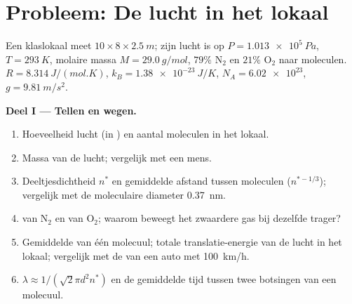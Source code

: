 \section{Probleem: De lucht in het lokaal}

\begin{problem}
\label{pb:b1:kinetic-theory:1}
Een klaslokaal meet $10 \times 8 \times \qty{2.5}{m}$; zijn lucht is op
$P = \qty{1.013e5}{Pa}$, $T = \qty{293}{K}$, molaire massa $M = \qty{29.0}{g/mol}$,
$79\%$ N$_2$ en $21\%$ O$_2$ naar moleculen. $R = \qty{8.314}{J/(mol.K)}$,
$k_B = \qty{1.38e-23}{J/K}$, $N_A = \num{6.02e23}$, $g = \qty{9.81}{m/s^2}$.

\medskip
\noindent\textbf{Deel I --- Tellen en wegen.}
\begin{enumerate}
  \item Hoeveelheid lucht (in ) en aantal moleculen in het lokaal.
  \item Massa van de lucht; vergelijk met een mens.
  \item Deeltjesdichtheid $n^*$ en gemiddelde afstand tussen moleculen
        ($n^{*-1/3}$); vergelijk met de moleculaire diameter \qty{0.37}{nm}.
  \item {} van N$_2$ en van O$_2$; waarom beweegt het
        zwaardere gas bij dezelfde  trager?
  \item Gemiddelde  van één molecuul; totale translatie-energie
        van de lucht in het lokaal; vergelijk met de  van een
        auto met \qty{100}{km/h}.
  \item {} $\lambda \approx 1/(\sqrt2\pi d^2n^*)$ en de gemiddelde
        tijd tussen twee botsingen van een molecuul.
\end{enumerate}


\end{problem}

